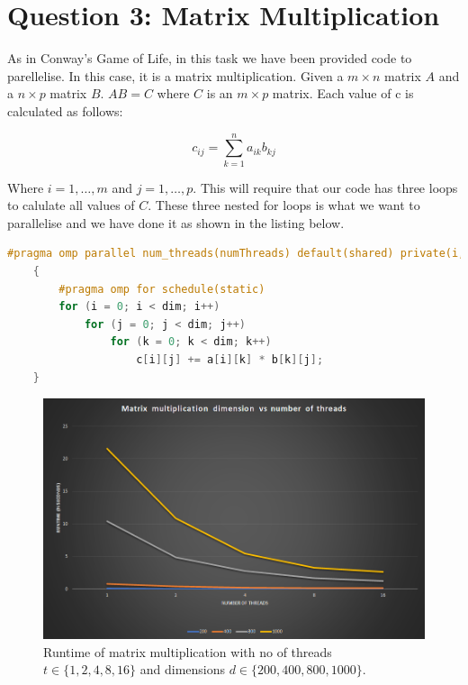 \section{Question 3: Matrix Multiplication}

As in Conway's Game of Life, in this task we have been provided code to parellelise.
In this case, it is a matrix multiplication. Given a $m \times n$ matrix $A$ and
a $n \times p$ matrix $B$. $AB = C$ where $C$ is an $m \times p$ matrix. Each value
of c is calculated as follows:

\begin{equation}
    c_{ij} = \sum_{k=1}^{n} a_{ik}b_{kj}
\end{equation}

Where $i = 1, \dots, m$ and $j = 1, \dots, p$. This will require that our code 
has three loops to calulate all values of $C$. These three nested for loops 
is what we want to parallelise and we have done it as shown in the listing below.

\begin{lstlisting}[language=C++]
    #pragma omp parallel num_threads(numThreads) default(shared) private(i, j, k)
    {
        #pragma omp for schedule(static)
        for (i = 0; i < dim; i++)
            for (j = 0; j < dim; j++)
                for (k = 0; k < dim; k++)
                    c[i][j] += a[i][k] * b[k][j];
    }
\end{lstlisting}

\begin{figure}
    \centering
    \includegraphics[width=\linewidth]{Figures/Matmul.png}
    \caption{
        Runtime of matrix multiplication with no of threads $t \in \{1,2,4,8,16\}$
        and dimensions $d \in \{200,400,800,1000\}$.
    }
    \label{fig:matmulspeedup}
\end{figure}

